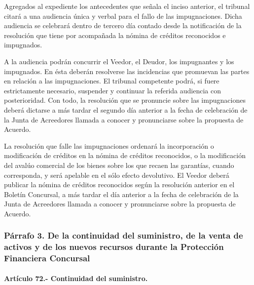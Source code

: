 \documentclass[
]{book}
\begin{document}
Agregados al expediente los antecedentes que señala el inciso anterior, el tribunal citará a una audiencia única y verbal para el fallo de las impugnaciones. Dicha audiencia se celebrará dentro de tercero día contado desde la notificación de la resolución que tiene por acompañada la nómina de créditos reconocidos e impugnados.

A la audiencia podrán concurrir el Veedor, el Deudor, los impugnantes y los impugnados. En ésta deberán resolverse las incidencias que promuevan las partes en relación a las impugnaciones. El tribunal competente podrá, si fuere estrictamente necesario, suspender y continuar la referida audiencia con posterioridad. Con todo, la resolución que se pronuncie sobre las impugnaciones deberá dictarse a más tardar el segundo día anterior a la fecha de celebración de la Junta de Acreedores llamada a conocer y pronunciarse sobre la propuesta de Acuerdo.

La resolución que falle las impugnaciones ordenará la incorporación o modificación de créditos en la nómina de créditos reconocidos, o la modificación del avalúo comercial de los bienes sobre los que recaen las garantías, cuando corresponda, y será apelable en el sólo efecto devolutivo. El Veedor deberá publicar la nómina de créditos reconocidos según la resolución anterior en el Boletín Concursal, a más tardar el día anterior a la fecha de celebración de la Junta de Acreedores llamada a conocer y pronunciarse sobre la propuesta de Acuerdo.

\hypertarget{puxe1rrafo-3.-de-la-continuidad-del-suministro-de-la-venta-de-activos-y-de-los-nuevos-recursos-durante-la-protecciuxf3n-financiera-concursal}{%
\subsubsection*{Párrafo 3. De la continuidad del suministro, de la venta de activos y de los nuevos recursos durante la Protección Financiera Concursal}\label{puxe1rrafo-3.-de-la-continuidad-del-suministro-de-la-venta-de-activos-y-de-los-nuevos-recursos-durante-la-protecciuxf3n-financiera-concursal}}

\hypertarget{artuxedculo-72.--continuidad-del-suministro.}{%
\paragraph*{Artículo 72.- Continuidad del suministro.}\label{artuxedculo-72.--continuidad-del-suministro.}}
\end{document}
